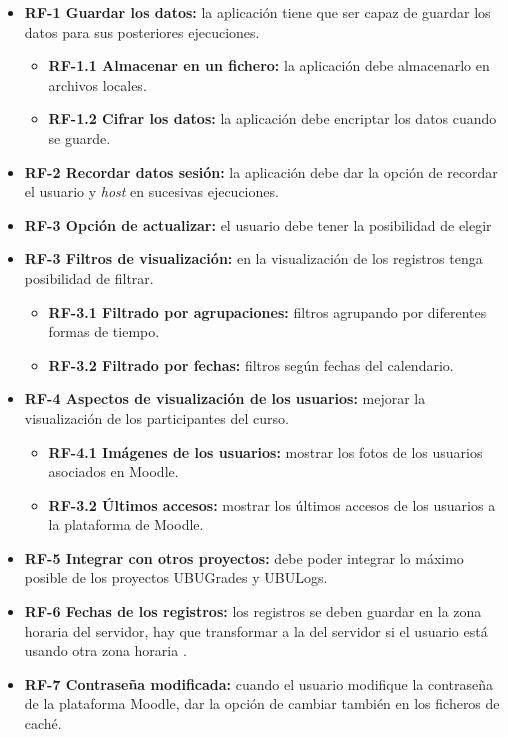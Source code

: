 \begin{itemize}
	

	\item \textbf{RF-1 Guardar los datos:} la aplicación tiene que ser capaz de guardar los datos para sus posteriores ejecuciones.
	\begin{itemize}
		\item \textbf{RF-1.1 Almacenar en un fichero:} la aplicación debe almacenarlo en archivos locales.
		\item \textbf{RF-1.2 Cifrar los datos:} la aplicación debe encriptar los datos cuando se guarde.
	\end{itemize}
	\item \textbf{RF-2 Recordar datos sesión:} la aplicación debe dar la opción de recordar el usuario y \textit{host} en sucesivas ejecuciones.
	\item \textbf{RF-3 Opción de actualizar:} el usuario debe tener la posibilidad de elegir 
	\item \textbf{RF-3 Filtros de visualización:} en la visualización de los registros tenga posibilidad de filtrar.
	\begin{itemize}
		\item \textbf{RF-3.1 Filtrado por agrupaciones:} filtros agrupando por diferentes formas de tiempo.
		\item \textbf{RF-3.2 Filtrado por fechas:} filtros según fechas del calendario.
	\end{itemize}
	\item \textbf{RF-4 Aspectos de visualización de los usuarios:} mejorar la visualización de los participantes del curso.
		\begin{itemize}
		\item \textbf{RF-4.1 Imágenes de los usuarios:} mostrar los fotos de los usuarios asociados en Moodle.
		\item \textbf{RF-3.2 Últimos accesos:} mostrar los últimos accesos de los usuarios a la plataforma de Moodle.
	\end{itemize}
	\item \textbf{RF-5 Integrar con otros proyectos:} debe poder integrar lo máximo posible de los proyectos UBUGrades y UBULogs.
	\item \textbf{RF-6 Fechas de los registros:} los registros se deben guardar en la zona horaria del servidor, hay que transformar a la del servidor si el usuario está usando otra zona horaria .
	\item \textbf{RF-7 Contraseña modificada:} cuando el usuario modifique la contraseña de la plataforma Moodle, dar la opción de cambiar también en los ficheros de caché.
	
\end{itemize}

